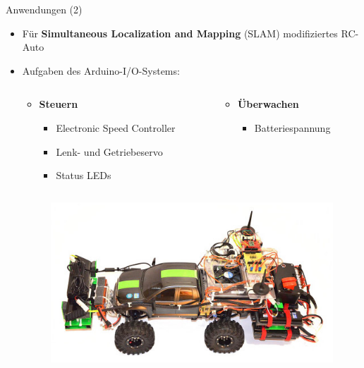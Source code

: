 \documentclass{beamer}
\begin{document}
\begin{frame}{Anwendungen (2)}
\begin{itemize}
 \item F\"ur \textbf{Simultaneous Localization and Mapping} (SLAM) modifiziertes RC-Auto
 \item Aufgaben des Arduino-I/O-Systems:
 \begin{columns}
  \begin{column}{0.5\textwidth}
  \begin{itemize}
   \item \textbf{Steuern}
   \begin{itemize}
    \item Electronic Speed Controller
    \item Lenk- und Getriebeservo
    \item Status LEDs
   \end{itemize}
  \end{itemize}
  \end{column}
  \begin{column}{0.5\textwidth}
  \begin{itemize}
   \item \textbf{\"Uberwachen}
   \begin{itemize}
    \item Batteriespannung
   \end{itemize}
  \end{itemize}
  \end{column}
 \end{columns}
\begin{figure}[htbp]
 \centering
 \includegraphics[scale=0.40]{./images/robot-beauty-queen.jpg}
\end{figure}
\end{itemize}
\end{frame}
\end{document}
